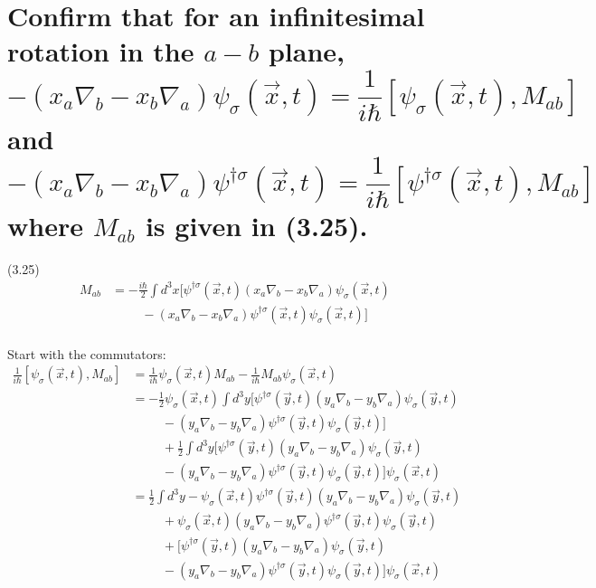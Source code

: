 \section{Confirm that for an infinitesimal rotation in the $a-b$ plane, $$-(x_a \nabla_b - x_b \nabla_a)\psi_\sigma(\vec{x},t) = \frac{1}{i\hbar}[\psi_\sigma(\vec{x},t), M_{ab}]$$ and $$-(x_a \nabla_b - x_b \nabla_a)\psi^{\dagger\sigma}(\vec{x},t) = \frac{1}{i\hbar}[\psi^{\dagger\sigma}(\vec{x},t), M_{ab}]$$ where $M_{ab}$ is given in (3.25).}

(3.25)
\begin{align*}
    M_{ab} &= -\frac{i\hbar}{2}\int d^3x [\psi^{\dagger\sigma}(\vec{x},t)(x_a \nabla_b - x_b \nabla_a)\psi_{\sigma}(\vec{x},t) \\
    &\hspace{1cm}-(x_a \nabla_b - x_b \nabla_a)\psi^{\dagger\sigma}(\vec{x},t)\psi_{\sigma}(\vec{x},t)] \\
\end{align*}

Start with the commutators:
\begin{align*}
    \frac{1}{i\hbar}[\psi_\sigma(\vec{x},t), M_{ab}] &= \frac{1}{i\hbar}\psi_\sigma(\vec{x},t)M_{ab} - \frac{1}{i\hbar}M_{ab}\psi_\sigma(\vec{x},t) \\
    &=  -\frac{1}{2}\psi_\sigma(\vec{x},t)\int d^3y [\psi^{\dagger\sigma}(\vec{y},t)(y_a \nabla_b - y_b \nabla_a)\psi_{\sigma}(\vec{y},t) \\
    &\hspace{1cm}-(y_a \nabla_b - y_b \nabla_a)\psi^{\dagger\sigma}(\vec{y},t)\psi_{\sigma}(\vec{y},t)] \\
    &\hspace{1cm}+\frac{1}{2}\int d^3y [\psi^{\dagger\sigma}(\vec{y},t)(y_a \nabla_b - y_b \nabla_a)\psi_{\sigma}(\vec{y},t) \\
    &\hspace{1cm}-(y_a \nabla_b - y_b \nabla_a)\psi^{\dagger\sigma}(\vec{y},t)\psi_{\sigma}(\vec{y},t)]\psi_\sigma(\vec{x},t) \\
    &=  \frac{1}{2}\int d^3y -\psi_\sigma(\vec{x},t)\psi^{\dagger\sigma}(\vec{y},t)(y_a \nabla_b - y_b \nabla_a)\psi_{\sigma}(\vec{y},t) \\
    &\hspace{1cm}+\psi_\sigma(\vec{x},t)(y_a \nabla_b - y_b \nabla_a)\psi^{\dagger\sigma}(\vec{y},t)\psi_{\sigma}(\vec{y},t) \\
    &\hspace{1cm}+[\psi^{\dagger\sigma}(\vec{y},t)(y_a \nabla_b - y_b \nabla_a)\psi_{\sigma}(\vec{y},t) \\
    &\hspace{1cm}-(y_a \nabla_b - y_b \nabla_a)\psi^{\dagger\sigma}(\vec{y},t)\psi_{\sigma}(\vec{y},t)]\psi_\sigma(\vec{x},t) \\
\end{align*}

